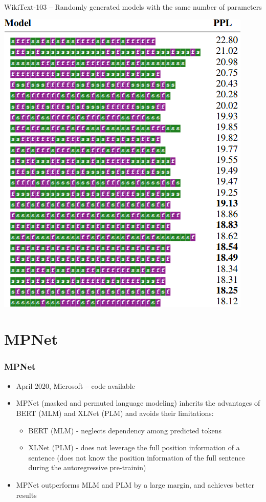 \documentclass{beamer}
\begin{document}
\begin{frame}
    WikiText-103 -- Randomly generated models with the same number of parameters
    \begin{center}
        \includegraphics[scale=0.34]{img/sandwich_transformers_models2.png}
    \end{center}
\end{frame}




\section{MPNet}
\begin{frame}
    \frametitle{MPNet \cite{mpnet}}
    \begin{itemize}
        \item April 2020, Microsoft -- code available
        \item MPNet (masked and permuted language modeling) inherits the advantages of BERT (MLM) and XLNet (PLM) and avoids their limitations:
        \begin{itemize}
            \item BERT (MLM) - neglects dependency among predicted tokens
            \item XLNet (PLM) - does not leverage the full position information of a sentence (does not know the position information of the full sentence during the autoregressive pre-trainin)
        \end{itemize}
        \item MPNet outperforms MLM and PLM by a large margin, and achieves better results
    \end{itemize}
\end{frame}
\end{document}
